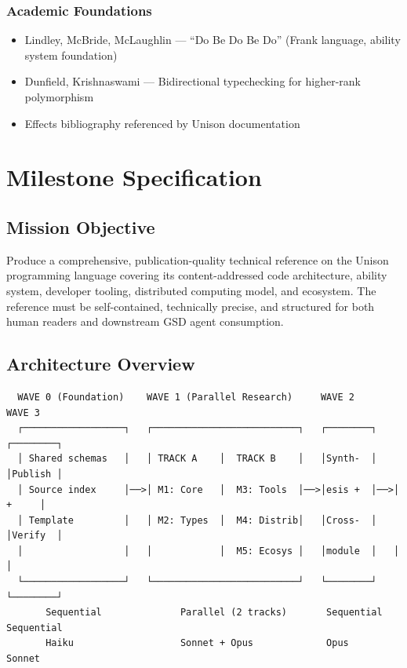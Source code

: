 \documentclass[11pt,letterpaper]{article}
\newcommand{\stageheader}[2]{%
  \noindent\colorbox{#2}{\makebox[\textwidth][l]{%
    \textcolor{white}{\bfseries\sffamily\hspace{6pt}#1\hspace{6pt}}}}%
  \vspace{0.5em}\par%
}
\begin{document}
\subsubsection*{Academic Foundations}
\begin{itemize}[leftmargin=2em]
  \item Lindley, McBride, McLaughlin --- ``Do Be Do Be Do'' (Frank language, ability system foundation)
  \item Dunfield, Krishnaswami --- Bidirectional typechecking for higher-rank polymorphism
  \item Effects bibliography referenced by Unison documentation
\end{itemize}

\newpage

\stageheader{STAGE 3 --- MISSION PACKAGE}{tertiary}

\section{Milestone Specification}

\subsection{Mission Objective}

Produce a comprehensive, publication-quality technical reference on the Unison programming language covering its content-addressed code architecture, ability system, developer tooling, distributed computing model, and ecosystem. The reference must be self-contained, technically precise, and structured for both human readers and downstream GSD agent consumption.

\subsection{Architecture Overview}

\begin{asciibox}
\begin{verbatim}
  WAVE 0 (Foundation)    WAVE 1 (Parallel Research)     WAVE 2       WAVE 3
  ┌──────────────────┐   ┌──────────────────────────┐   ┌────────┐   ┌────────┐
  │ Shared schemas   │   │ TRACK A    │  TRACK B    │   │Synth-  │   │Publish │
  │ Source index     │──>│ M1: Core   │  M3: Tools  │──>│esis +  │──>│  +     │
  │ Template         │   │ M2: Types  │  M4: Distrib│   │Cross-  │   │Verify  │
  │                  │   │            │  M5: Ecosys │   │module  │   │        │
  └──────────────────┘   └──────────────────────────┘   └────────┘   └────────┘
       Sequential              Parallel (2 tracks)       Sequential   Sequential
       Haiku                   Sonnet + Opus             Opus         Sonnet
\end{verbatim}
\end{asciibox}
\end{document}

